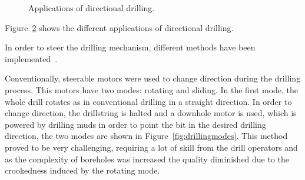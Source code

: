 \begin{figure}[ht]
\begin{subfigure}[b]{0.45\textwidth}
		\caption{\label{fig:app4}}
	\end{subfigure}
	\caption{\label{fig:apps}Applications of directional drilling.}
\end{figure}

Figure~\ref{fig:apps} shows the different applications of directional drilling. 

In order to steer the drilling mechanism, different methods have been implemented~\cite{Downton2000}. 

Conventionally, steerable motors were used to change direction during the drilling process. This motors have two modes: rotating and sliding. In the first mode, the whole drill rotates as in conventional drilling in a straight direction. In order to change direction, the drillstring is halted and a downhole motor is used, which is powered by drilling muds in order to point the bit in the desired drilling direction, the two modes are shown in Figure~\ref{fig:drillingmodes}. This method proved to be very challenging, requiring a lot of skill from the drill operators and as the complexity of boreholes was increased the quality diminished due to the crookedness induced by the rotating mode. 




